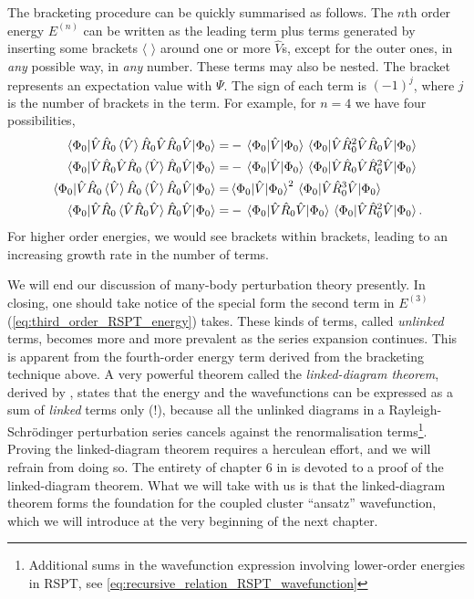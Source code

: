 The bracketing procedure can be quickly summarised as follows. The $n$th order 
energy $E^{(n)}$ can be written as the leading term plus terms generated by inserting 
some brackets $\langle$ $\rangle$ around one or more $\hat{V}$s, except for the outer 
ones, in \emph{any} possible way, in \emph{any} number. These terms may also be nested.
The bracket represents an expectation value with $\Psi$. The sign of each term is 
$(-1)^j$, where $j$ is the number of brackets in the term. 
For example, for $n=4$ we have four possibilities,
\begin{align}
    \mel{\Phi_0}{\hat{V}\hat{R}_0\ev*{\hat{V}}\hat{R}_0\hat{V}\hat{R}_0\hat{V}}{\Phi_0}
        =& - \mel{\Phi_0}{\hat{V}}{\Phi_0}
            \mel{\Phi_0}{\hat{V}\hat{R}_0^2\hat{V}\hat{R}_0\hat{V}}{\Phi_0} \\
    \mel{\Phi_0}{\hat{V}\hat{R}_0\hat{V}\hat{R}_0\ev*{\hat{V}}\hat{R}_0\hat{V}}{\Phi_0}
        =& - \mel{\Phi_0}{\hat{V}}{\Phi_0}
            \mel{\Phi_0}{\hat{V}\hat{R}_0\hat{V}\hat{R}_0^2\hat{V}}{\Phi_0} \\
    \mel{\Phi_0}{\hat{V}\hat{R}_0\ev*{\hat{V}}\hat{R}_0\ev*{\hat{V}}\hat{R}_0\hat{V}}{\Phi_0}
        =&  \mel{\Phi_0}{\hat{V}}{\Phi_0}^2
            \mel{\Phi_0}{\hat{V}\hat{R}_0^3\hat{V}}{\Phi_0} \\
    \mel{\Phi_0}{\hat{V}\hat{R}_0\ev*{\hat{V}\hat{R}_0\hat{V}}\hat{R}_0\hat{V}}{\Phi_0}
        =& - \mel{\Phi_0}{\hat{V}\hat{R}_0\hat{V}}{\Phi_0}
            \mel{\Phi_0}{\hat{V}\hat{R}_0^2\hat{V}}{\Phi_0}.
\end{align}
For higher order energies, we would see brackets within brackets, leading to an increasing 
growth rate in the number of terms.

We will end our discussion of many-body perturbation theory presently. In closing, 
one should take notice of the special form the second term in $E^{(3)}$
(\autoref{eq:third_order_RSPT_energy}) takes. These kinds of terms, called \emph{unlinked} terms, 
becomes more and more prevalent as the series expansion continues. This is apparent from 
the fourth-order energy term derived from the bracketing technique above. A very powerful theorem 
called the \emph{linked-diagram theorem}, derived by
\citeauthor{goldstone1957derivation} \cite{goldstone1957derivation}, states that the 
energy and the wavefunctions can be expressed as a sum of \emph{linked} terms only (!),
because all the 
unlinked diagrams in a Rayleigh-Schrödinger perturbation series cancels against the 
renormalisation terms\footnote{Additional sums in the  wavefunction expression 
involving lower-order energies in RSPT,
see \autoref{eq:recursive_relation_RSPT_wavefunction}}. Proving the linked-diagram 
theorem requires a herculean effort, and we will refrain from doing so. The entirety 
of chapter 6 in \citeauthor{shavitt2009many} \cite{shavitt2009many} is devoted to 
a proof of the linked-diagram theorem. What we will take with us is that the linked-diagram
theorem forms the foundation for the 
coupled cluster ``ansatz'' wavefunction, which we will introduce at the very beginning 
of the next chapter.
